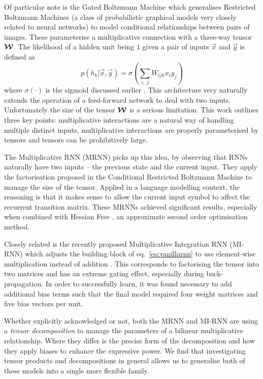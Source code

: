 Of particular note is the
Gated Boltzmann Machine \autocite{Memisevic2007} which generalises Restricted
Boltzmann Machines \autocite{Smolensky1986} (a class of probabilistic graphical models very closely
related to neural networks) to model conditional relationships between pairs of images. These 
parameterise a multiplicative connection with a three-way tensor \(\bm{\mathcal{W}}\).
The likelihood of a hidden unit
being \(1\) given a pair of inputs \(\vec{x}\) and \(\vec{y}\) is defined as
\begin{equation}\label{eq:grbm}
	p(h_k | \vec{x},\vec{y}) = \sigma\left(\sum_{i,\;j} W_{ijk}x_iy_j \right)
\end{equation} where \(\sigma(\cdot)\) is the sigmoid discussed earlier \autocite{Memisevic2007}.
This architecture very naturally extends the operation of a feed-forward network to deal with
two inputs.
Unfortunately the size of the
tensor \(\bm{\mathcal{W}}\) is a serious limitation. This work outlines three key points: 
multiplicative interactions are a natural way of handling multiple distinct inputs,
multiplicative interactions are properly parameterised by tensors
and tensors can be prohibitively large.

The Multiplicative RNN \autocite{Martens2011a, Sutskever2013} (MRNN) picks up this idea, by observing
that RNNs naturally have two inputs -- the previous state and the current input. They apply the
factorisation proposed in the Conditional Restricted Boltzmann Machine 
\autocite{Taylor, Memisevic2010} to manage the size of the tensor.
Applied in a language modelling context, the reasoning is that it
makes sense to allow the current input symbol to affect the recurrent transition matrix. These MRNNs
achieved significant results, especially when combined with Hessian Free \autocite{Martens2011},
an approximate second order optimisation method.

Closely related is the recently proposed Multiplicative Integration RNN (MI-RNN)
 which adjusts the building block of eq.~\eqref{eq:vanillarnn} to use element-wise multiplication instead
of addition \autocite{Wu2016}.
 This corresponds to factorising the tensor into two matrices and has an extreme gating
effect, especially during back-propagation.
In order to successfully learn, it was found necessary to add additional bias terms such that
the final model required four weight matrices and five bias vectors per unit.

Whether explicitly acknowledged or not, both the MRNN and MI-RNN are using a \emph{tensor decomposition}
to manage the parameters of a bilinear 
multiplicative relationship. Where they differ is the precise form of
the decomposition and how they apply biases to enhance the expressive power. We find that investigating
tensor products and decompositions in general allows us to generalise both of these models into a single
more flexible family. 

